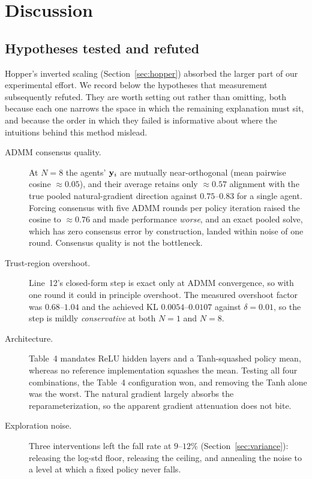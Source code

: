 \section{Discussion}
\label{sec:discussion}

\subsection{Hypotheses tested and refuted}

Hopper's inverted scaling (Section~\ref{sec:hopper}) absorbed the larger part
of our experimental effort. We record below the hypotheses that measurement
subsequently refuted. They are worth setting out rather than omitting, both
because each one narrows the space in which the remaining explanation must sit,
and because the order in which they failed is informative about where the
intuitions behind this method mislead.

\begin{description}
  \item[ADMM consensus quality.] At $N=8$ the agents' $\mathbf{y}_i$ are mutually
    near-orthogonal (mean pairwise cosine $\approx 0.05$), and their average
    retains only $\approx 0.57$ alignment with the true pooled natural-gradient
    direction against $0.75$--$0.83$ for a single agent. Forcing consensus with five ADMM rounds per policy iteration raised the
    cosine to $\approx 0.76$ and made performance \emph{worse}, and an exact
    pooled solve, which has zero consensus error by construction, landed within
    noise of one round. Consensus quality is not the bottleneck.
  \item[Trust-region overshoot.] Line~12's closed-form step is exact only at
    ADMM convergence, so with one round it could in principle overshoot. The
    measured overshoot factor was $0.68$--$1.04$ and the achieved KL
    $0.0054$--$0.0107$ against $\delta = 0.01$, so the step is mildly
    \emph{conservative} at both $N=1$ and $N=8$.
  \item[Architecture.] Table~4 mandates ReLU hidden layers and a Tanh-squashed
    policy mean, whereas no reference implementation squashes the mean. Testing
    all four combinations, the Table~4 configuration won, and removing the Tanh
    alone was the worst. The natural gradient largely absorbs the
    reparameterization, so the apparent gradient attenuation does not bite.
  \item[Exploration noise.] Three interventions left the fall rate at
    $9$--$12\%$ (Section~\ref{sec:variance}): releasing the log-std floor,
    releasing the ceiling, and annealing the noise to a level at which a fixed
    policy never falls.
\end{description}


